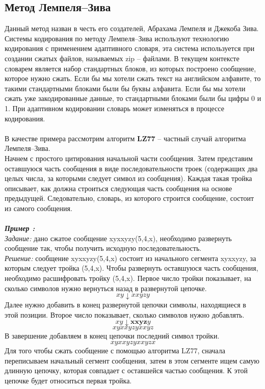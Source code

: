 \subsection{Метод Лемпеля--Зива}
Данный метод назван в честь его создателей, Абрахама Лемпеля и Джекоба Зива. Системы кодирования по методу Лемпеля--Зива используют технологию кодирования с применением адаптивного словаря, эта система используется при создании сжатых файлов, называемых zip – файлами. В текущем контексте словарем является набор стандартных блоков,  из которых построено сообщение, которое нужно сжать. Если бы мы хотели сжать текст на английском алфавите, то такими стандартными блоками были бы буквы алфавита. Если бы мы хотели сжать уже закодированные данные, то стандартными блоками были бы цифры 0 и 1. При адаптивном кодировании словарь может изменяться в процессе кодирования.\\
\\В качестве примера рассмотрим алгоритм \textbf{LZ77} – частный случай алгоритма Лемпеля--Зива.\\
Начнем с простого цитирования начальной части сообщения. Затем представим оставшуюся часть сообщения в виде последовательности троек (содержащих два целых числа, за которыми следует символ из сообщения). Каждая такая тройка описывает, как должна строиться следующая часть сообщения на основе предыдущей. Следовательно, словарь, из которого строится сообщение, состоит из самого сообщения.\\
\\\emph{\textbf{Пример :}}
\\\emph{Задание:} дано сжатое сообщение xyxxyzy(5,4,x), необходимо развернуть сообщение так, чтобы получить исходную последовательность.
\\\emph{Решение:} сообщение xyxxyzy(5,4,x) состоит из начального сегмента xyxxyzy, за которым следует тройка (5,4,x).
Чтобы развернуть оставшуюся часть сообщения, необходимо расшифровать тройку (5,4,x). Первое число тройки показывает, на сколько символов нужно вернуться назад в развернутой цепочке.
$$xy\downarrow xxyzy$$
 Далее нужно добавить в конец развернутой цепочки символы, находящиеся в этой позиции. Второе число показывает, сколько символов нужно добавлять.
$$xy\downarrow \textbf{xxyz}y$$
$$xyxxyzyxxyz$$
В завершение добавляем в конец цепочки последний символ тройки.
$$xyxxyzyxxyzx$$
Для того чтобы сжать сообщение с помощью алгоритма LZ77, сначала переписываем начальный сегмент сообщения, затем в этом сегменте ищем самую длинную цепочку, которая совпадает с оставшейся частью сообщения. К этой цепочке будет относиться первая тройка. 
